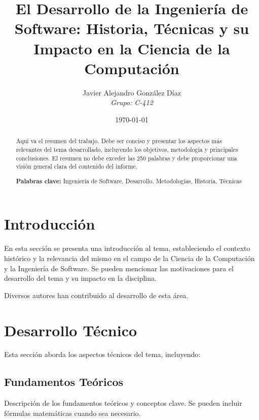 \documentclass[12pt,a4paper]{article}
\title{\textbf{El Desarrollo de la Ingeniería de Software: Historia, Técnicas y su Impacto en la Ciencia de la Computación}}
\author{
    Javier Alejandro González Díaz \\
    \textit{Grupo: C-412}
}
\date{\today}
\begin{document}
\maketitle
\thispagestyle{empty}

\begin{abstract}
\noindent
Aquí va el resumen del trabajo. Debe ser conciso y presentar los aspectos más relevantes del tema desarrollado, incluyendo los objetivos, metodología y principales conclusiones. El resumen no debe exceder las 250 palabras y debe proporcionar una visión general clara del contenido del informe.

\vspace{0.5cm}
\noindent
\textbf{Palabras clave:} Ingeniería de Software, Desarrollo, Metodologías, Historia, Técnicas
\end{abstract}

\newpage

\tableofcontents
\newpage

\section{Introducción}

En esta sección se presenta una introducción al tema, estableciendo el contexto histórico y la relevancia del mismo en el campo de la Ciencia de la Computación y la Ingeniería de Software. Se pueden mencionar las motivaciones para el desarrollo del tema y su impacto en la disciplina.

Diversos autores han contribuido al desarrollo de esta área.





\section{Desarrollo Técnico}

Esta sección aborda los aspectos técnicos del tema, incluyendo:

\subsection{Fundamentos Teóricos}

Descripción de los fundamentos teóricos y conceptos clave. Se pueden incluir fórmulas matemáticas cuando sea necesario.
\end{document}
